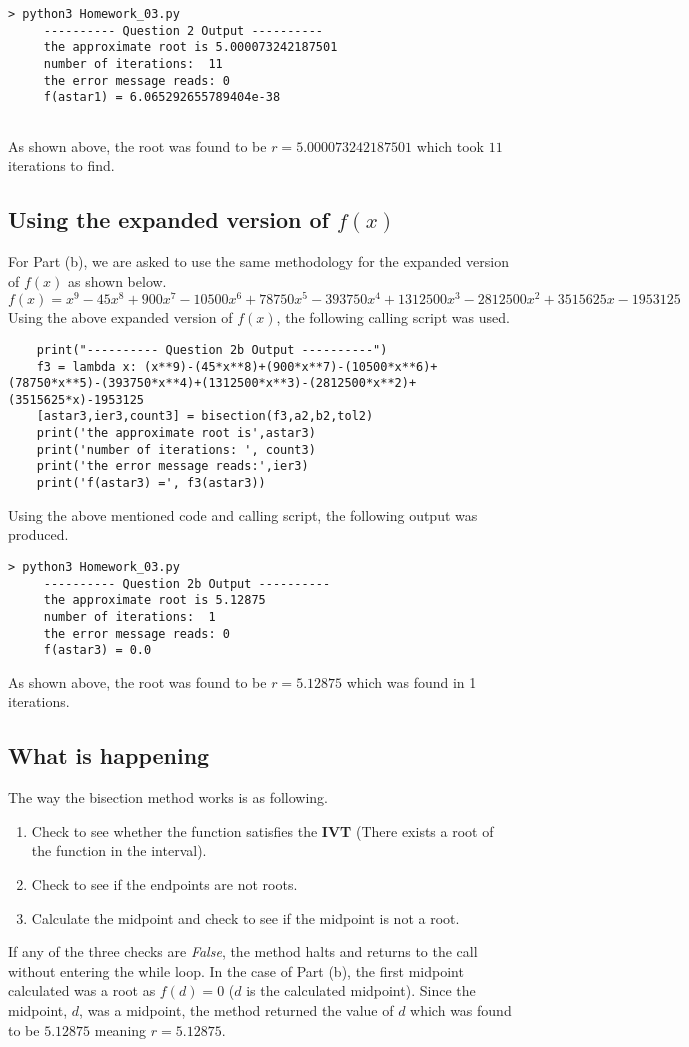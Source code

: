\documentclass{article}
\theoremstyle{theorem}
\begin{document}
\begin{lstlisting}
> python3 Homework_03.py
     ---------- Question 2 Output ----------
     the approximate root is 5.000073242187501
     number of iterations:  11
     the error message reads: 0
     f(astar1) = 6.065292655789404e-38
     
\end{lstlisting}
As shown above, the root was found to be \(r=5.000073242187501\) which took \(11\) iterations to find.

\subsection{Using the expanded version of \(f(x)\)}
For Part (b), we are asked to use the same methodology for the expanded version of \(f(x)\) as shown below.
\[
f(x) = x^9-45x^8+900x^7-10500x^6+78750x^5-393750x^4+1312500x^3-2812500x^2+3515625x-1953125
\]
Using the above expanded version of \(f(x)\), the following calling script was used.
\begin{lstlisting}
    print("---------- Question 2b Output ----------")
    f3 = lambda x: (x**9)-(45*x**8)+(900*x**7)-(10500*x**6)+(78750*x**5)-(393750*x**4)+(1312500*x**3)-(2812500*x**2)+(3515625*x)-1953125
    [astar3,ier3,count3] = bisection(f3,a2,b2,tol2)
    print('the approximate root is',astar3)
    print('number of iterations: ', count3)
    print('the error message reads:',ier3)
    print('f(astar3) =', f3(astar3))
\end{lstlisting}
Using the above mentioned code and calling script, the following output was produced.
\begin{lstlisting}
> python3 Homework_03.py
     ---------- Question 2b Output ----------
     the approximate root is 5.12875
     number of iterations:  1
     the error message reads: 0
     f(astar3) = 0.0
\end{lstlisting}
As shown above, the root was found to be \(r=5.12875\) which was found in 1 iterations.

\subsection{What is happening}
The way the bisection method works is as following.
\begin{enumerate}
    \item Check to see whether the function satisfies the \textbf{IVT} (There exists a root of the function in the interval).
    \item Check to see if the endpoints are not roots.
    \item Calculate the midpoint and check to see if the midpoint is not a root.
\end{enumerate}
If any of the three checks are \textit{False}, the method halts and returns to the call without entering the while loop. In the case of Part (b), the first midpoint calculated was a root as \(f(d) = 0\) (\(d\) is the calculated midpoint). Since the midpoint, \(d\), was a midpoint, the method returned the value of \(d\) which was found to be \(5.12875\) meaning \(r=5.12875\).
\end{document}
